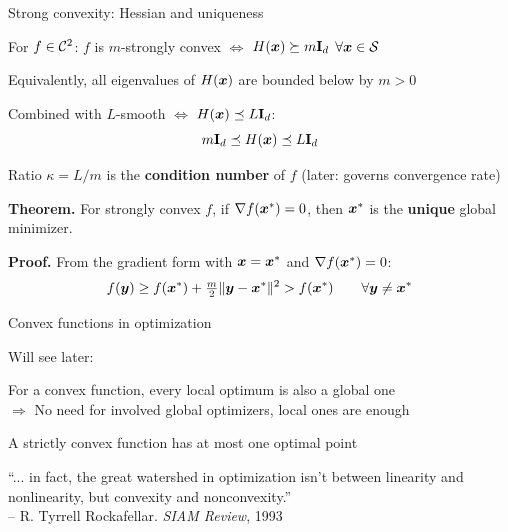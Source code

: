\documentclass[11pt,compress,t,notes=noshow, xcolor=table]{beamer}
\begin{document}
\begin{framei}{Strong convexity: Hessian and uniqueness}
\item For $f \in \mathcal{C}^{2}$: $f$ is $m$-strongly convex $\Longleftrightarrow$ $H(\bm{x}) \succeq m \mathbf{I}_d$ $\forall \bm{x} \in \mathcal{S}$
\item Equivalently, all eigenvalues of $H(\bm{x})$ are bounded below by $m > 0$
\item Combined with $L$-smooth $\Leftrightarrow$ $H(\bm{x}) \preceq L \mathbf{I}_d$:
$$
m \mathbf{I}_d \preceq H(\bm{x}) \preceq L \mathbf{I}_d
$$
\item Ratio $\kappa = L/m$ is the \textbf{condition number} of $f$ (later: governs convergence rate)
\spacer
\item \textbf{Theorem.} For strongly convex $f$, if $\nabla f(\bm{x}^\ast) = 0$, then $\bm{x}^\ast$ is the \textbf{unique} global minimizer.
\item \textbf{Proof.} From the gradient form with $\bm{x} = \bm{x}^\ast$ and $\nabla f(\bm{x}^\ast) = 0$:
$$
f(\bm{y}) \geq f(\bm{x}^\ast) + \tfrac{m}{2}\|\bm{y} - \bm{x}^\ast\|^2 > f(\bm{x}^\ast) \qquad \forall \bm{y} \neq \bm{x}^\ast
$$
\end{framei}


\begin{framei}{Convex functions in optimization}
\item Will see later:
\item For a convex function, every local optimum is also a global one \\
$\Rightarrow$ No need for involved global optimizers, local ones are enough
\item A strictly convex function has at most one optimal point
\item \enquote{... in fact, the great watershed in optimization isn't between linearity and nonlinearity, but convexity and nonconvexity.}\\
-- R. Tyrrell Rockafellar. \textit{SIAM Review}, 1993
\end{framei}

\endlecture
\end{document}
